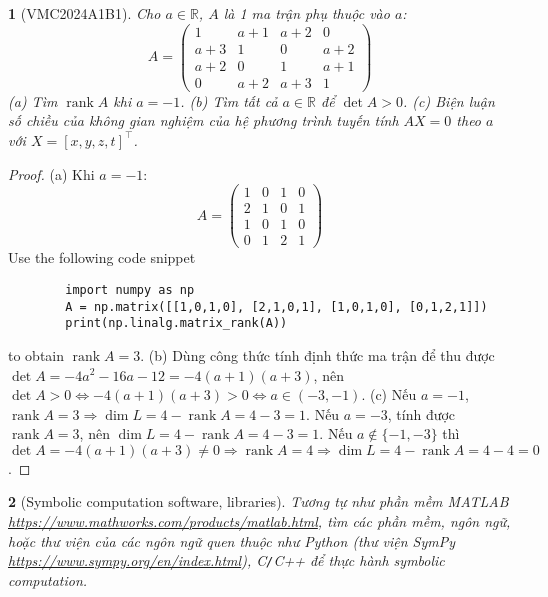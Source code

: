 \documentclass{article}
\newtheorem{baitoan}{}
\begin{document}
\begin{baitoan}[VMC2024A1B1]
	Cho $a\in\mathbb{R}$, $A$ là 1 ma trận phụ thuộc vào $a$:
	\begin{equation}
		A = \begin{pmatrix}
			1 & a + 1 & a + 2 & 0\\a + 3 & 1 & 0 & a + 2\\a + 2 & 0 & 1 & a + 1\\0 & a + 2 & a + 3 & 1
		\end{pmatrix}
	\end{equation}
	(a) Tìm $\operatorname{rank}A$ khi $a = -1$. (b) Tìm tất cả $a\in\mathbb{R}$ để $\det A > 0$. (c) Biện luận số chiều của không gian nghiệm của hệ phương trình tuyến tính $AX = 0 $ theo $a$ với $X = [x,y,z,t]^\top$.
\end{baitoan}

\begin{proof}
	(a) Khi $a = -1$:
	\begin{equation}
		A = \begin{pmatrix}
			1 & 0 & 1 & 0\\2 & 1 & 0 & 1\\1 & 0 & 1 & 0\\0 &1 & 2 & 1
		\end{pmatrix}
	\end{equation}
	Use the following code snippet
	\begin{verbatim}
		import numpy as np
		A = np.matrix([[1,0,1,0], [2,1,0,1], [1,0,1,0], [0,1,2,1]])
		print(np.linalg.matrix_rank(A))
	\end{verbatim}
	to obtain $\operatorname{rank}A = 3$. (b) Dùng công thức tính định thức ma trận để thu được $\det A = -4a^2 - 16a - 12 = -4(a + 1)(a + 3)$, nên $\det A > 0\Leftrightarrow-4(a + 1)(a + 3) > 0\Leftrightarrow a\in(-3,-1)$. (c) Nếu $a = -1$, $\operatorname{rank}A = 3\Rightarrow\dim L = 4 - \operatorname{rank}A = 4 - 3 = 1$. Nếu $a = -3$, tính được $\operatorname{rank}A = 3$, nên $\dim L = 4 - \operatorname{rank}A = 4 - 3 = 1$. Nếu $a\notin\{-1,-3\}$ thì $\det A = -4(a + 1)(a + 3)\ne0\Rightarrow\operatorname{rank}A = 4\Rightarrow\dim L = 4 - \operatorname{rank}A = 4 - 4 = 0$.	
\end{proof}

\begin{baitoan}[Symbolic computation software, libraries]
	Tương tự như phần mềm MATLAB \url{https://www.mathworks.com/products/matlab.html}, tìm các phần mềm, ngôn ngữ, hoặc thư viện của các ngôn ngữ quen thuộc như Python (thư viện SymPy \url{https://www.sympy.org/en/index.html}), C{\tt/}C++ để thực hành symbolic computation.
\end{baitoan}
\end{document}
